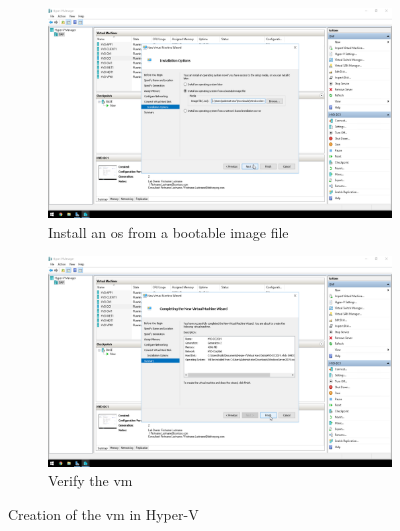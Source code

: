 \begin{figure}[!htb]\ContinuedFloat
	\begin{subfigure}{0.5\textwidth}
		\captionsetup{width=0.8\linewidth}
		\includegraphics[width=0.9\linewidth]{img/Methodologie/Migration2.png}
		\centering
		\caption{Install an \acrshort{os} from a bootable image file}
	\end{subfigure}
	\begin{subfigure}{0.5\textwidth}
		\captionsetup{width=0.8\linewidth}
		\includegraphics[width=0.9\linewidth]{img/Methodologie/Migration3.png} 
		\centering	
		\caption{Verify the \acrshort{vm}}
	\end{subfigure}
	\caption[\acrshort{vm} Creation]{Creation of the \acrshort{vm} in Hyper-V}
	\label{fig:VMCreation}
\end{figure}
